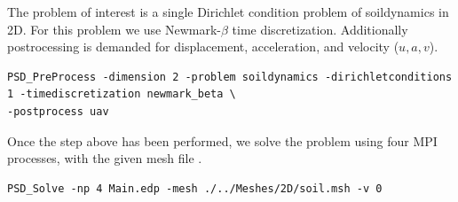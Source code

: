 \newcommand{\psd}[1]{{\small\sffamily{\color{blue!60}#1}}}


The problem of interest is a single Dirichlet condition problem of
soildynamics in 2D. For this problem we use Newmark-\(\beta\) time
discretization. Additionally postrocessing is demanded for displacement,
acceleration, and velocity (\(u,a,v\)).

\begin{lstlisting}[style=BashInputStyle]
PSD_PreProcess -dimension 2 -problem soildynamics -dirichletconditions 1 -timediscretization newmark_beta \
-postprocess uav
\end{lstlisting}

Once the step above has been performed, we solve the problem using four
MPI processes, with the given mesh file \psd{soil.msh}.

\begin{lstlisting}[style=BashInputStyle]
PSD_Solve -np 4 Main.edp -mesh ./../Meshes/2D/soil.msh -v 0
\end{lstlisting}

